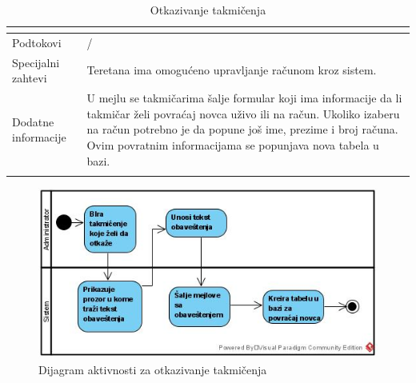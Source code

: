 \documentclass[../../main.tex]{subfiles}
\begin{document}
\begin{longtable}{| p{} | p{} |}
\begin{itemize}
    \end{itemize}\\
\hline
    Podtokovi & /\\
\hline
    Specijalni zahtevi & Teretana ima omogućeno upravljanje računom kroz sistem.\\
\hline
    Dodatne informacije & U mejlu se takmičarima šalje formular koji ima informacije da li takmičar želi povraćaj novca uživo ili na račun. Ukoliko izaberu na račun potrebno je da popune još ime, prezime i broj računa. Ovim povratnim informacijama se popunjava nova tabela u bazi. \\
\hline
\caption{Otkazivanje takmičenja} %
\end{longtable}

\begin{figure}[!ht]
\begin{center}
\includegraphics[scale=0.55]{sections/images/dijagram_aktivnosti_otkazivanje_takmicenja.jpg}
\end{center}
\caption{Dijagram aktivnosti za otkazivanje takmičenja}
\label{fig:kontekst}
\end{figure}
\end{document}
